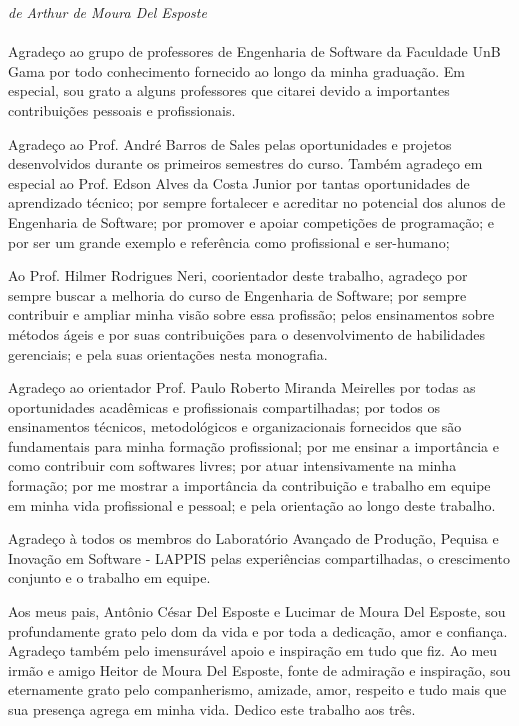 \begin{agradecimentos}

%

\emph{de Arthur de Moura Del Esposte} \\ \\

%

Agradeço ao grupo de professores de Engenharia de Software da Faculdade UnB Gama por todo conhecimento fornecido ao longo da minha graduação. Em especial, sou grato a alguns professores que citarei devido a importantes contribuições pessoais e profissionais.

%

Agradeço ao Prof. André Barros de Sales pelas oportunidades e projetos desenvolvidos durante os primeiros semestres do curso. Também agradeço em especial ao Prof. Edson Alves da Costa Junior por tantas oportunidades de aprendizado técnico; por sempre fortalecer e acreditar no potencial dos alunos de Engenharia de Software; por promover e apoiar competições de programação; e por ser um grande exemplo e referência como profissional e ser-humano;

%

Ao Prof. Hilmer Rodrigues Neri, coorientador deste trabalho, agradeço por sempre buscar a melhoria do curso de Engenharia de Software; por sempre contribuir e ampliar minha visão sobre essa profissão; pelos ensinamentos sobre métodos ágeis e por suas contribuições para o desenvolvimento de habilidades gerenciais; e pela suas orientações nesta monografia.

%

Agradeço ao orientador Prof. Paulo Roberto Miranda Meirelles por todas as oportunidades acadêmicas e profissionais compartilhadas; por todos os ensinamentos técnicos, metodológicos e organizacionais fornecidos que são fundamentais para minha formação profissional; por me ensinar a importância e como contribuir com softwares livres; por atuar intensivamente na minha formação; por me mostrar a importância da contribuição e trabalho em equipe em minha vida profissional e pessoal; e pela orientação ao longo deste trabalho.

%

Agradeço à todos os membros do Laboratório Avançado de Produção, Pequisa e Inovação em Software - LAPPIS pelas experiências compartilhadas, o crescimento conjunto e o trabalho em equipe.

%

Aos meus pais, Antônio César Del Esposte e Lucimar de Moura Del Esposte, sou profundamente grato pelo dom da vida e por toda a dedicação, amor e confiança. Agradeço também pelo imensurável apoio e inspiração em tudo que fiz. Ao meu irmão e amigo Heitor de Moura Del Esposte, fonte de admiração e inspiração, sou eternamente grato pelo companherismo, amizade, amor, respeito e tudo mais que sua presença agrega em minha vida. Dedico este trabalho aos três.


\end{agradecimentos}
